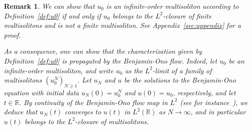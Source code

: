 \documentclass[english, 12pt]{amsart}%
\newcommand{\R}{\mathbb{R}}
\newtheorem{remark}[definition]{Remark}
\numberwithin{equation}{section}
\begin{document}
\begin{remark}\label{rem:charact}
We can show that $u_0$ is an infinite-order multisoliton according to Definition~\ref{def:u0} if and only if $u_0$ belongs to the $L^2$-closure of finite multisolitons and is not a finite multisoliton. See Appendix~\ref{sec:appendix} for a proof.

As a consequence, one can show that the characterization given by Definition~\ref{def:u0} is propagated by the Benjamin-Ono flow. Indeed, let $u_0$ be an infinite-order multisoliton, and write $u_0$ as the $L^2$-limit of a family of multisolitons $(u_0^N)_{N\geq 1}$. Let $u_N$ and $u$ be the solutions to the Benjamin-Ono equation with initial data $u_N(0)=u_0^N$ and $u(0)=u_0$, respectively, and let $t\in\R$. By continuity of the Benjamin-Ono flow map in $L^2$ (see for instance~\cite{KillipLaurensVisan23-BO}), we deduce that $u_N(t)$ converges to $u(t)$ in $L^2(\R)$ as $N\to\infty$, and in particular $u(t)$ belongs to the $L^2$-closure of multisolitons.
\end{remark}
\end{document}
